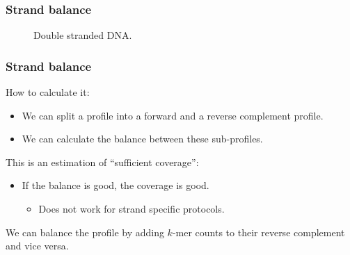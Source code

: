 \documentclass[slidestop]{beamer}
\begin{document}
\begin{frame}
  \frametitle{Strand balance}

  \begin{figure}[]
    \begin{center}
    \end{center}
    \caption{Double stranded DNA.}
    \label{}
  \end{figure}

\end{frame}

\begin{frame}
  \frametitle{Strand balance}

  How to calculate it:
  \begin{itemize}
    \item We can split a profile into a forward and a reverse complement
      profile.
    \item We can calculate the balance between these sub-profiles.
  \end{itemize}
  \bigskip
  \pause

  This is an estimation of ``sufficient coverage'':
  \begin{itemize}
    \item If the balance is good, the coverage is good.
    \begin{itemize}
      \item Does not work for strand specific protocols.
    \end{itemize}
  \end{itemize}
  \bigskip
  \pause

   We can balance the profile by adding $k$-mer counts to their reverse
   complement and vice versa.
\end{frame}
\end{document}
